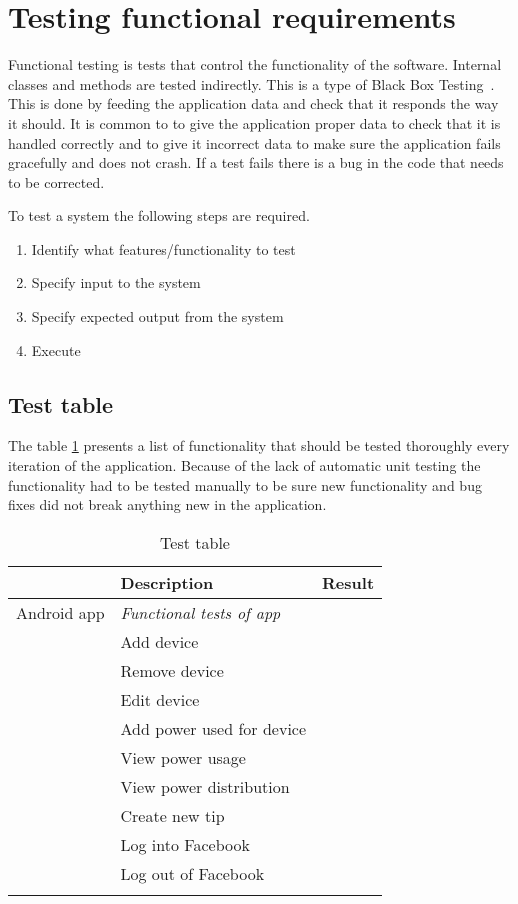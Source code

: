\section{Testing functional requirements}
\label{sec:funcTest}
Functional testing is tests that control the functionality of the software. Internal classes and methods are tested indirectly. This is a type of Black Box Testing~\cite{blackbox}. This is done by feeding the application data and check that it responds the way it should. It is common to to give the application proper data to check that it is handled correctly and to give it incorrect data to make sure the application fails gracefully and does not crash. If a test fails there is a bug in the code that needs to be corrected.

To test a system the following steps are required.
\begin{enumerate}
\item Identify what features/functionality to test
\item Specify input to the system
\item Specify expected output from the system
\item Execute
\end{enumerate}

\subsection{Test table}
The table \ref{tab:testTable} presents a list of functionality that should be tested thoroughly every iteration of the application. Because of the lack of automatic unit testing the functionality had to be tested manually to be sure new functionality and bug fixes did not break anything new in the application.

\begin{table}[H]
\begin{tabular}{|l|l|l|}
\hline
\rowcolor{darkgray} & \textbf{Description} & \textbf{Result}\\\hline \arrayrulecolor{lightgray}
\rowcolors{0}{darkgray}{lightgray}
Android app & \textit{Functional tests of app} &  \\ \cline{1-2}\cline{2-3}
&Add device&\\ \cline{1-2}\cline{2-3}
&Remove device&\\ \cline{1-2}\cline{2-3}
&Edit device&\\ \cline{1-2}\cline{2-3}
&Add power used for device&\\ \cline{1-2}\cline{2-3}
&View power usage&\\ \cline{1-2}\cline{2-3}
&View power distribution&\\ \cline{1-2}\cline{2-3}
&Create new tip&\\ \cline{1-2}\cline{2-3}
&Log into Facebook&\\ \cline{1-2}\cline{2-3}
&Log out of Facebook&\\\arrayrulecolor{black}
\hline
\end{tabular}
\caption{Test table}
\label{tab:testTable}
\end{table}


